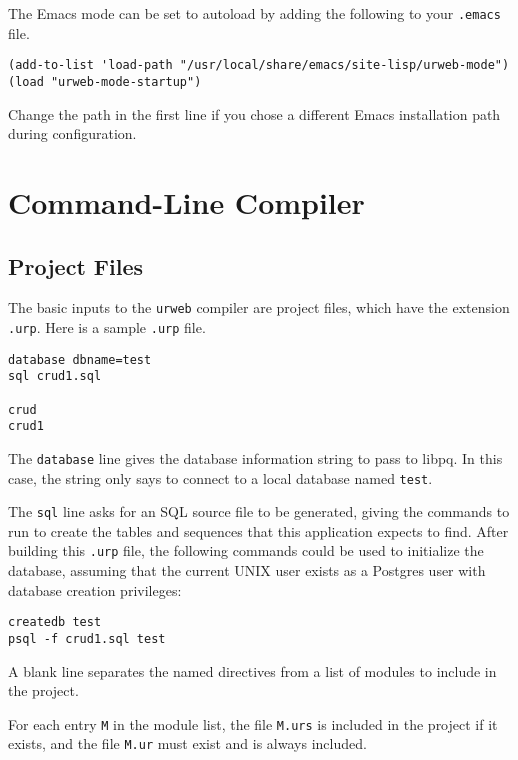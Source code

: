\documentclass{article}
\begin{document}
The Emacs mode can be set to autoload by adding the following to your \texttt{.emacs} file.

\begin{verbatim}
(add-to-list 'load-path "/usr/local/share/emacs/site-lisp/urweb-mode")
(load "urweb-mode-startup")
\end{verbatim}

Change the path in the first line if you chose a different Emacs installation path during configuration.


\section{Command-Line Compiler}

\subsection{Project Files}

The basic inputs to the \texttt{urweb} compiler are project files, which have the extension \texttt{.urp}.  Here is a sample \texttt{.urp} file.

\begin{verbatim}
database dbname=test
sql crud1.sql

crud
crud1
\end{verbatim}

The \texttt{database} line gives the database information string to pass to libpq.  In this case, the string only says to connect to a local database named \texttt{test}.

The \texttt{sql} line asks for an SQL source file to be generated, giving the commands to run to create the tables and sequences that this application expects to find.  After building this \texttt{.urp} file, the following commands could be used to initialize the database, assuming that the current UNIX user exists as a Postgres user with database creation privileges:

\begin{verbatim}
createdb test
psql -f crud1.sql test
\end{verbatim}

A blank line separates the named directives from a list of modules to include in the project.

For each entry \texttt{M} in the module list, the file \texttt{M.urs} is included in the project if it exists, and the file \texttt{M.ur} must exist and is always included.
\end{document}
